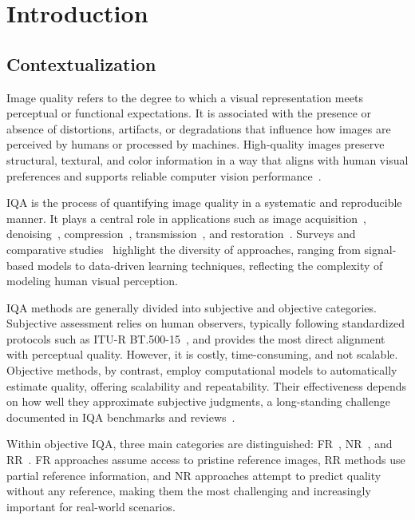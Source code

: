 \chapter{Introduction}\label{chap:introduction}

\section{Contextualization}\label{sec:contextualization}

Image quality refers to the degree to which a visual representation meets perceptual or functional expectations. It is associated with the presence or absence of distortions, artifacts, or degradations that influence how images are perceived by humans or processed by machines. High-quality images preserve structural, textural, and color information in a way that aligns with human visual preferences and supports reliable computer vision performance~\cite{survey2019shahrukh, ma2025survey}.

\acf{IQA} is the process of quantifying image quality in a systematic and reproducible manner. It plays a central role in applications such as image acquisition~\cite{survey2017aquisition}, denoising~\cite{survey2023denoising}, compression~\cite{rabbani1991digital, survey2025compression}, transmission~\cite{chandra2016transmission, survey2019transmission}, and restoration~\cite{survey2025restoration}. Surveys and comparative studies~\cite{survey2019shahrukh, survey2006wang, survey2009thung, survey2020zhai} highlight the diversity of approaches, ranging from signal-based models to data-driven learning techniques, reflecting the complexity of modeling human visual perception.

\acs{IQA} methods are generally divided into subjective and objective categories. Subjective assessment relies on human observers, typically following standardized protocols such as \acf{ITU-R BT.500-15}~\cite{itu2023r}, and provides the most direct alignment with perceptual quality. However, it is costly, time-consuming, and not scalable. Objective methods, by contrast, employ computational models to automatically estimate quality, offering scalability and repeatability. Their effectiveness depends on how well they approximate subjective judgments, a long-standing challenge documented in \acs{IQA} benchmarks and reviews~\cite{survey2006wang}.

Within objective \acs{IQA}, three main categories are distinguished: \acf{FR}~\cite{survey2019shahrukh}, \acf{NR}~\cite{kamble2015nriqa}, and \acf{RR}~\cite{dost2022rriqa}. \acs{FR} approaches assume access to pristine reference images, \acs{RR} methods use partial reference information, and \acs{NR} approaches attempt to predict quality without any reference, making them the most challenging and increasingly important for real-world scenarios.


